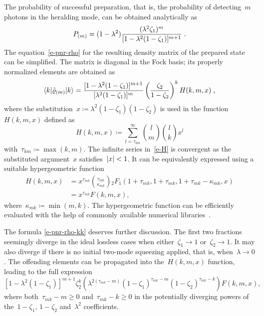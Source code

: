 \documentclass{article}
\begin{document}
The probability of successful preparation, that is, the probability of detecting~$m$ photons in the heralding mode, can be obtained analytically as
%
\begin{equation}\label{e-pnr-pro}
  P_{(m)} = (1 - \lambda^{2}) 
  \frac
    { (\lambda^{2} \zeta_{1})^{m} }
    { [ 1 - \lambda^{2} (1 - \zeta_{1}) ]^{m + 1} } \;\text{.}
\end{equation}
%
The equation~\eqref{e-pnr-rho} for the resulting density matrix of the prepared state can be simplified. The matrix is diagonal in the Fock basis; its properly normalized elements are obtained as
%
\begin{equation}\label{e-pnr-rho-kk}
  \braket{ k | \hat{\varrho}_{(m)} | k } =
  \frac
    { [ 1 - \lambda^{2} (1 - \zeta_{1}) ]^{m + 1} }
    { [ \lambda^{2} (1 - \zeta_{1}) ]^{m} }
  \left( \frac{ \zeta_{2} }{ 1 - \zeta_{2} } \right)^{k}
  H (k, m, x) \;\text{,}
\end{equation}
%
where the substitution~${x \coloneqq \lambda^{2} ( 1 - \zeta_{1} )(1 - \zeta_{2} )}$ is used in the function~$H(k, m, x)$ defined as
%
\begin{equation}\label{e-H}
  H(k, m, x) \coloneq
  \sum\limits_{l = \tau_{km}}^{\infty}
    \binom{l}{m}
    \binom{l}{k}
    x^{l} 
\end{equation}
%
with~${\tau_{km} \coloneqq \max(k, m)}$. The infinite series in~\eqref{e-H} is convergent as the substituted argument~$x$ satisfies~${\lvert x \rvert < 1}$. It can be equivalently expressed using a suitable hypergeometric function~\cite{bateman1981}
%
\begin{equation}
  \begin{aligned}
    H(k, m, x) & =
    x^{\tau_{mk}} 
    \binom
      {\tau_{mk}}
      {\kappa_{mk}}
    {}_{2}F_{1} (
      1 + \tau_{mk},
      1 + \tau_{mk},
      1 + \tau_{mk} - \kappa_{mk},
      x
    ) \\
    & =
    x^{\tau_{mk}} F(k, m, x),
  \end{aligned}
\end{equation}
%
where~${\kappa_{mk} \coloneqq \min (m, k)}$. The hypergeometric function can be efficiently evaluated with the help of commonly available numerical libraries~\cite{virtanen2020}. 

The formula \eqref{e-pnr-rho-kk} deserves further discussion. The first two fractions seemingly diverge in the ideal lossless cases when either~${\zeta_{1} \to 1}$ or~${\zeta_{2} \to 1}$. It may also diverge if there is no initial two-mode squeezing applied, that is, when~${\lambda \to 0}$. The offending elements can be propagated into the~$H(k, m, x)$ function, leading to the full expression
%
\begin{equation}
  { [ 1 - \lambda^{2} (1 - \zeta_{1}) ]^{m + 1} }
  { \zeta_{2}^{k} }
  \left(
    \lambda^{2 (\tau_{mk} - m)}
    (1 - \zeta_{1})^{\tau_{mk} - m}
    (1 - \zeta_{2})^{\tau_{mk} - k}
  \right)
  F (k, m, x),
\end{equation}
%
where both~${\tau_{mk} - m \geq 0}$ and~${\tau_{mk} - k \geq 0}$ in the potentially diverging powers of the~${1 - \zeta_{1}}$, ${1 - \zeta_{2}}$ and~$\lambda^{2}$ coefficients.
\end{document}
